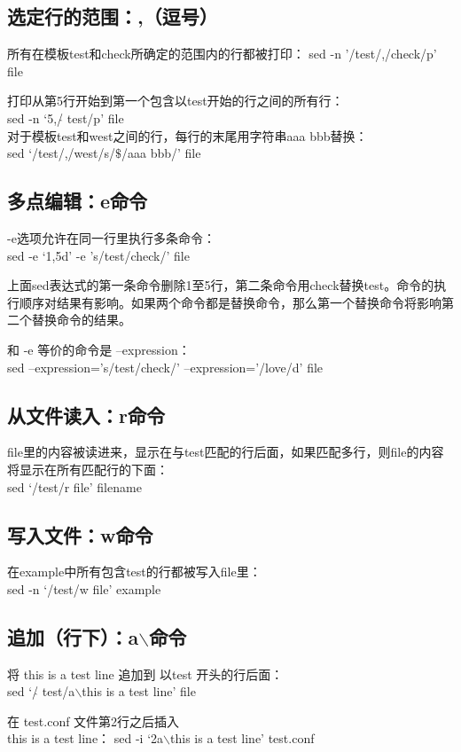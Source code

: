 \documentclass[12pt,a4paper]{article}
\begin{document}
\subsection{选定行的范围：,（逗号）}
所有在模板test和check所确定的范围内的行都被打印：
sed -n '/test/,/check/p' file 

打印从第5行开始到第一个包含以test开始的行之间的所有行：\\
sed -n `5,/$\hat{}$ test/p' file \\
对于模板test和west之间的行，每行的末尾用字符串aaa bbb替换：\\
sed `/test/,/west/s/$\$$/aaa bbb/' file 

\subsection{多点编辑：e命令}
-e选项允许在同一行里执行多条命令：\\
sed -e `1,5d' -e 's/test/check/' file 

上面sed表达式的第一条命令删除1至5行，第二条命令用check替换test。命令的执行顺序对结果有影响。如果两个命令都是替换命令，那么第一个替换命令将影响第二个替换命令的结果。 

和 -e 等价的命令是 --expression： \\
sed --expression='s/test/check/' --expression='/love/d' file 

\subsection{从文件读入：r命令}
file里的内容被读进来，显示在与test匹配的行后面，如果匹配多行，则file的内容将显示在所有匹配行的下面：\\
sed `/test/r file' filename 

\subsection{写入文件：w命令}
在example中所有包含test的行都被写入file里：\\
sed -n `/test/w file' example 

\subsection{追加（行下）：a$\backslash$命令}
将 this is a test line 追加到 以test 开头的行后面：\\
sed `/$\hat{}$ test/a$\backslash$this is a test line' file 

在 test.conf 文件第2行之后插入\\
this is a test line： sed -i `2a$\backslash$this is a test line' test.conf 
\end{document}
